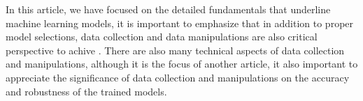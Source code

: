 
\par
In this article, we have focused on the detailed fundamentals that underline machine learning models, it is important to emphasize that in addition to proper model selections, data collection and data manipulations are also critical perspective to achive . There are also many technical aspects of data collection and manipulations, although it is the focus of another article, it also important to appreciate the significance of data collection and manipulations on the accuracy and robustness of the trained models.
\par 
